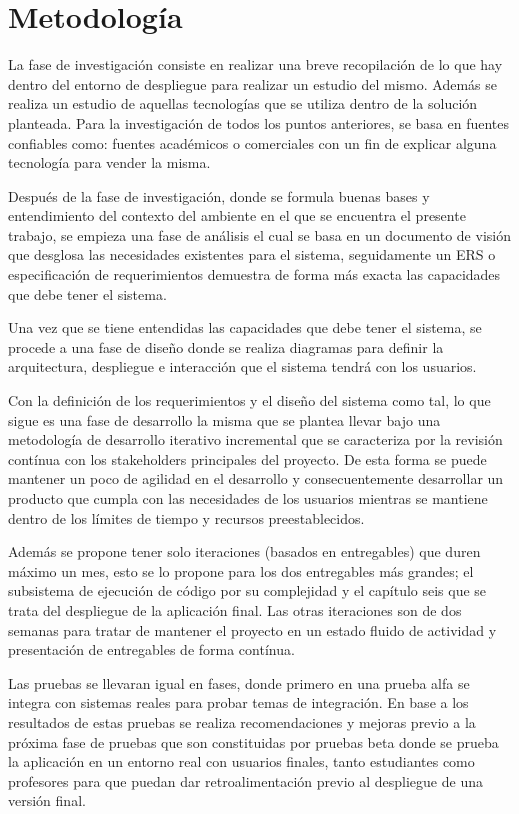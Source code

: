 \section{Metodología}
La fase de investigación consiste en realizar una breve recopilación de lo que hay dentro del entorno de despliegue para realizar un estudio del mismo. Además se realiza un estudio de aquellas tecnologías que se utiliza dentro de la solución planteada. Para la investigación de todos los puntos anteriores, se basa en fuentes confiables como: fuentes académicos o comerciales con un fin de explicar alguna tecnología para vender la misma.
 
Después de la fase de investigación, donde se formula buenas bases y entendimiento del contexto del ambiente en el que se encuentra el presente trabajo, se empieza una fase de análisis el cual se basa en un documento de visión que desglosa las necesidades existentes para el sistema, seguidamente un ERS o especificación de requerimientos demuestra de forma más exacta las capacidades que debe tener el sistema.
 
Una vez que se tiene entendidas las capacidades que debe tener el sistema, se procede a una fase de diseño donde se realiza diagramas para definir la arquitectura, despliegue e interacción que el sistema tendrá con los usuarios.
 
Con la definición de los requerimientos y el diseño del sistema como tal, lo que sigue es una fase de desarrollo la misma que se plantea llevar bajo una metodología de desarrollo iterativo incremental que se caracteriza por la revisión contínua con los stakeholders principales del proyecto. De esta forma se puede mantener un poco de agilidad en el desarrollo y consecuentemente desarrollar un producto que cumpla con las necesidades de los usuarios mientras se mantiene dentro de los límites de tiempo y recursos preestablecidos.
 
Además se propone tener solo iteraciones (basados en entregables) que duren máximo un mes, esto se lo propone para los dos entregables más grandes; el subsistema de ejecución de código por su complejidad y el capítulo seis que se trata del despliegue de la aplicación final. Las otras iteraciones son de dos semanas para tratar de mantener el proyecto en un estado fluido de actividad y presentación de entregables de forma contínua.
 
Las pruebas se llevaran igual en fases, donde primero en una prueba alfa se integra con sistemas reales para probar temas de integración. En base a los resultados de estas pruebas se realiza recomendaciones y mejoras previo a la próxima fase de pruebas que son constituidas por pruebas beta donde se prueba la aplicación en un entorno real con usuarios finales, tanto estudiantes como profesores para que puedan dar retroalimentación previo al despliegue de una versión final.
 
